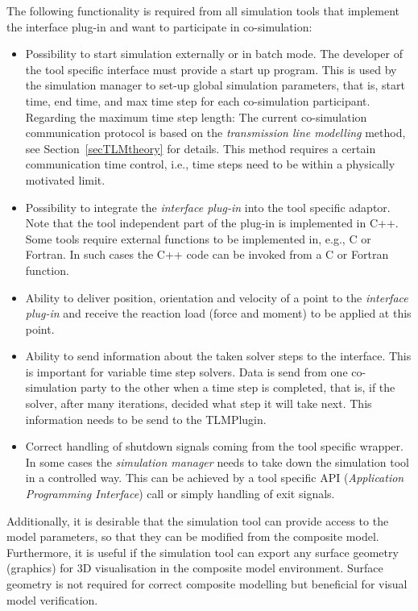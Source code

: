 The following functionality is required from all simulation tools that implement the interface plug-in and want to participate in
co-simulation:
\begin{itemize}
\item 
Possibility to start simulation externally or in batch mode.
The developer of the tool specific interface must provide a start up program. 
This is used by the simulation manager to set-up global simulation parameters, that is, start time, end time, and max time step for each co-simulation participant. 
Regarding the maximum time step length: The current co-simulation communication protocol is based on the {\em transmission line modelling} method, see Section~\ref{secTLMtheory} for details. 
This method requires a certain communication time control, i.e., time steps need to be within a physically motivated limit.

\item 
Possibility to integrate the {\em interface plug-in} into the tool specific adaptor. 
Note that the tool independent part of the plug-in is implemented in C++. 
Some tools require external functions to be implemented in, e.g., C or Fortran. 
In such cases the C++ code can be invoked from a C or Fortran function.

\item 
Ability to deliver position, orientation and velocity of a point to the {\em interface plug-in} and receive the reaction load (force and moment) to be applied at this point.

\item 
Ability to send information about the taken solver steps to the interface. 
This is important for variable time step solvers. 
Data is send from one co-simulation party to the other when a time step is completed, that is, if the solver, after many iterations, decided what step it will take next. 
This information needs to be send to the TLMPlugin.

\item 
Correct handling of shutdown signals coming from the tool specific wrapper. 
In some cases the {\em simulation manager} needs to	take down the simulation tool in a controlled way. 
This can be	achieved by a tool specific API ({\em Application Programming Interface}) call or simply handling of exit signals.

\end{itemize}

\noindent Additionally, it is desirable that the simulation tool can provide access to the model parameters, so that they can be modified from the composite model. Furthermore, it is useful if the simulation tool can export any surface geometry (graphics) for 3D visualisation in the composite model environment. 
Surface geometry is not required for correct composite modelling but beneficial for visual model verification.

